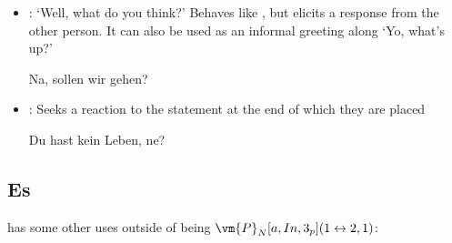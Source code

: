 \begin{itemize}
    \item {}: `Well, what do you think?' Behaves like , but  elicits a response from the other person. It  can also be used as an informal greeting along  `Yo, what's up?' \begin{example} Na, sollen wir gehen? \end{example}
    \item {}: Seeks a reaction to the statement at the end of which they are placed \begin{example}Du hast kein Leben, ne? \end{example}
\end{itemize}
\subsection[It]{Es}
 has some other uses outside of being $\vm{P}_N[a,In,3_p](1\leftrightarrow2,1)$:
